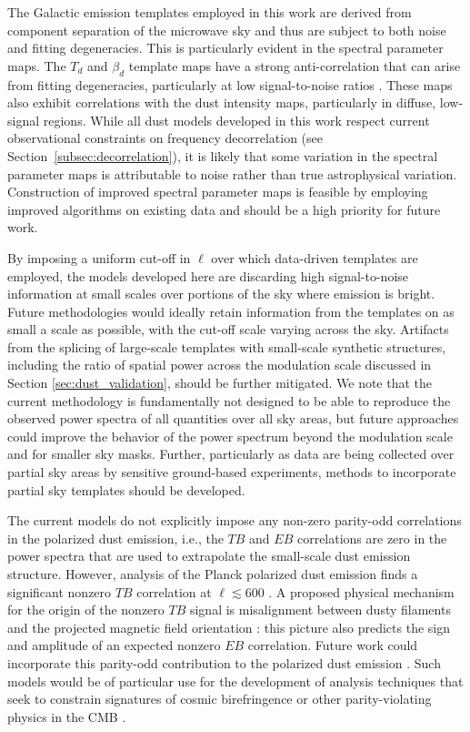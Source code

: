 \documentclass[twocolumn]{aastex631}
\begin{document}
The Galactic emission templates employed in this work are derived from component separation of the microwave sky and thus are subject to both noise and fitting degeneracies. This is particularly evident in the spectral parameter maps. The $T_d$ and $\beta_d$ template maps have a strong anti-correlation that can arise from fitting degeneracies, particularly at low signal-to-noise ratios \citep{Shetty:2009}. These maps also exhibit correlations with the dust intensity maps, particularly in diffuse, low-signal regions. While all dust models developed in this work respect current observational constraints on frequency decorrelation (see Section~\ref{subsec:decorrelation}), it is likely that some variation in the spectral parameter maps is attributable to noise rather than true astrophysical variation. Construction of improved spectral parameter maps is feasible by employing improved algorithms on existing data \citep[e.g.,][]{Watts:2024} and should be a high priority for future work.

By imposing a uniform cut-off in $\ell$ over which data-driven templates are employed, the models developed here are discarding high signal-to-noise information at small scales over portions of the sky where emission is bright. Future methodologies would ideally retain information from the templates on as small a scale as possible, with the cut-off scale varying across the sky. Artifacts from the splicing of large-scale templates with small-scale synthetic structures, including the ratio of spatial power across the modulation scale discussed in Section \ref{sec:dust_validation}, should be further mitigated. We note that the current methodology is fundamentally not designed to be able to reproduce the observed power spectra of all quantities over all sky areas, but future approaches could improve the behavior of the power spectrum beyond the modulation scale and for smaller sky masks. Further, particularly as data are being collected over partial sky areas by sensitive ground-based experiments, methods to incorporate partial sky templates should be developed.

The current models do not explicitly impose any non-zero parity-odd correlations in the polarized dust emission, i.e., the $TB$ and $EB$ correlations are zero in the power spectra that are used to extrapolate the small-scale dust emission structure. However, analysis of the Planck polarized dust emission finds a significant nonzero $TB$ correlation at $\ell \lesssim 600$ \citep{planck2016-l11A, Weiland:2020}. A proposed physical mechanism for the origin of the nonzero $TB$ signal is misalignment between dusty filaments and the projected magnetic field orientation \citep{Huffenberger:2020, Clark:2021, Cukierman:2023}: this picture also predicts the sign and amplitude of an expected nonzero $EB$ correlation. Future work could incorporate this parity-odd contribution to the polarized dust emission \citep[e.g.,][]{Hervias-Caimapo:2024}. Such models would be of particular use for the development of analysis techniques that seek to constrain signatures of cosmic birefringence or other parity-violating physics in the CMB \citep[e.g.,][]{Choi:2020, Minami:2020, Eskilt:2022, BICEP/KeckCollaboration:2024}.
\end{document}
